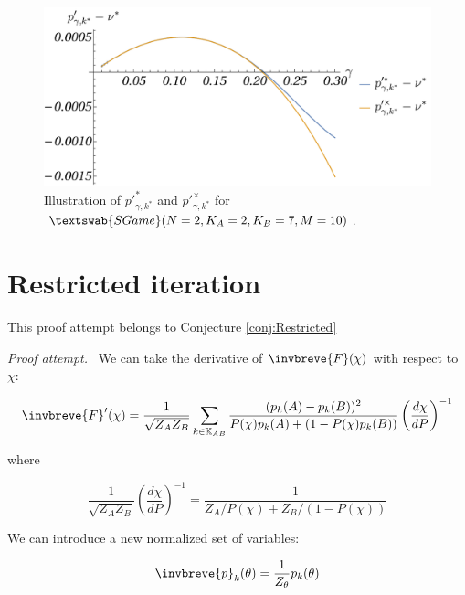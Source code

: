 \documentclass{article}
\theoremstyle{definition}
\newcommand{\SG}[1]{$\textswab{SGame}(#1)$}
\begin{document}
\begin{figure}[H]
    \centering
    \includegraphics[scale=0.8]{img/AsymptoticExpasion_pp.pdf}
    \caption{Illustration of $p'^*_{\gamma,k^*}$ and $p'^\times_{\gamma,k^*}$ for \SG{N=2,K_A=2,K_B=7,M=10}.}
    \label{fig:Asymptotic_pp}
\end{figure}



\section{Restricted iteration}
\label{appendix:Restricted}

This proof attempt belongs to Conjecture \ref{conj:Restricted}

\vspace{\baselineskip}

\noindent \emph{Proof attempt.} \ We can take the derivative of $\invbreve{F}(\chi)$ with respect to $\chi$:

    \begin{equation}
        \invbreve{F}'(\chi) = 
        \frac{1}{\sqrt{Z_A Z_B}} \sum_{k \in \mathbb{K}_{AB}} \frac{(p_k(A)-p_k(B))^2}{P(\chi) p_k(A)+(1-P(\chi)p_k(B))} 
        \left ( \frac{d \chi}{d P} \right )^{-1}
    \end{equation}

where

    \begin{equation} 
        \frac{1}{\sqrt{Z_A Z_B}} 
        \left ( \frac{d \chi}{d P} \right )^{-1} = \frac{1}{Z_A/P(\chi)+Z_B/(1-P(\chi))}
    \end{equation}

We can introduce a new normalized set of variables:

    \begin{equation}
        \invbreve{p}_k(\theta) = \frac{1}{Z_\theta} p_k(\theta)
    \end{equation}
\end{document}

